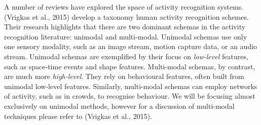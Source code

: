 A number of reviews have explored the space of activity recognition systems. (Vrigkas et al., 2015) develop a taxonomy human activity recognition schemes. Their research highlights that there are two dominant schemas in the activity recognition literature: unimodal and multi-modal. Unimodal schemas use only one sensory modality, such as an image stream, motion capture data, or an audio stream. Unimodal schemas are exemplified by their focus on \textit{low-level} features, such as space-time events and shape features. Multi-modal schemas, by contrast, are much more \textit{high-level}. They rely on behavioural features, often built from unimodal low-level features. Similarly, multi-modal schemas can employ networks of activity, such as in crowds, to recognise behaviour. We will be focusing almost exclusively on unimodal methods, however for a discussion of multi-modal techniques please refer to (Vrigkas et al., 2015). \\

